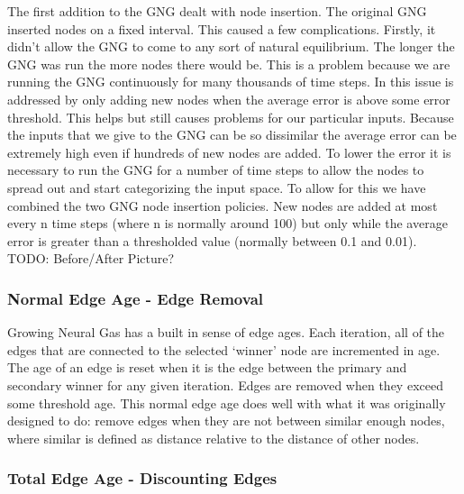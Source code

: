 \documentclass{article}
\renewcommand{\|}{\origbar} %
\begin{document}
The first addition to the GNG dealt with node insertion. The original GNG inserted nodes on a fixed interval. This caused a few complications. Firstly, it didn't allow the GNG to come to any sort of natural equilibrium. The longer the GNG was run the more nodes there would be. This is a problem because we are running the GNG continuously for many thousands of time steps. In  this issue is addressed by only adding new nodes when the average error is above some error threshold. This helps but still causes problems for our particular inputs. Because the inputs that we give to the GNG can be so dissimilar the average error can be extremely high even if hundreds of new nodes are added. To lower the error it is necessary to run the GNG for a number of time steps to allow the nodes to spread out and start categorizing the input space. To allow for this we have combined the two GNG node insertion policies. New nodes are added at most every n time steps (where n is normally around 100) but only while the average error is greater than a thresholded value (normally between 0.1 and 0.01). TODO: Before/After Picture?

\subsubsection{Normal Edge Age - Edge Removal}

Growing Neural Gas has a built in sense of edge ages. Each iteration, all of the edges that are connected to the selected `winner' node are incremented in age. The age of an edge is reset when it is the edge between the primary and secondary winner for any given iteration. Edges are removed when they exceed some threshold age. This normal edge age does well with what it was originally designed to do: remove edges when they are not between similar enough nodes, where similar is defined as distance relative to the distance of other nodes.

\subsubsection{Total Edge Age - Discounting Edges}
\end{document}
